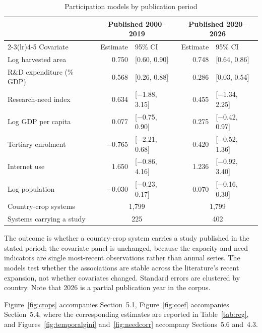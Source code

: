 \documentclass[ASNA,twocolumn]{USG}
\makeatletter
\newcommand{\applabel}[2]{\phantomsection\edef\@currentlabel{#1}\label{#2}}
\makeatother
\begin{document}
\begin{table}[!t]
\centering
\footnotesize
\caption{Participation models by publication period}
\label{tab:periods}
\begin{tabular*}{\textwidth}{@{\extracolsep\fill}l r@{\hspace{6pt}}l r@{\hspace{6pt}}l@{}}
\toprule
& \multicolumn{2}{c}{Published 2000--2019} & \multicolumn{2}{c}{Published 2020--2026} \\
\cmidrule(lr){2-3}\cmidrule(lr){4-5}
Covariate & Estimate & 95\% CI & Estimate & 95\% CI \\
\midrule
Log harvested area & 0.750 & [0.60, 0.90] & 0.748 & [0.64, 0.86] \\
R\&D expenditure (\% GDP) & 0.568 & [0.26, 0.88] & 0.286 & [0.03, 0.54] \\
Research-need index & 0.634 & [$-$1.88, 3.15] & 0.455 & [$-$1.34, 2.25] \\
Log GDP per capita & 0.077 & [$-$0.75, 0.90] & 0.275 & [$-$0.42, 0.97] \\
Tertiary enrolment & $-$0.765 & [$-$2.21, 0.68] & 0.420 & [$-$0.52, 1.36] \\
Internet use & 1.650 & [$-$0.86, 4.16] & 1.236 & [$-$0.92, 3.40] \\
Log population & $-$0.030 & [$-$0.23, 0.17] & 0.070 & [$-$0.16, 0.30] \\
\midrule
Country-crop systems & \multicolumn{2}{c}{1,799} & \multicolumn{2}{c}{1,799} \\
Systems carrying a study & \multicolumn{2}{c}{225} & \multicolumn{2}{c}{402} \\
\bottomrule
\end{tabular*}
\begin{tablenotes}
\item[] The outcome is whether a country-crop system carries a study published in the stated period; the covariate panel is unchanged, because the capacity and need indicators are single most-recent observations rather than annual series. The models test whether the associations are stable across the literature's recent expansion, not whether covariates changed. Standard errors are clustered by country. Note that 2026 is a partial publication year in the corpus.
\end{tablenotes}
\end{table}

\applabel{Appendix E}{app:figs}

Figure~\ref{fig:crops} accompanies Section~5.1, Figure~\ref{fig:coef} accompanies
Section~5.4, where the corresponding estimates are reported in Table~\ref{tab:reg}, and
Figures~\ref{fig:temporalgini} and~\ref{fig:needcorr} accompany Sections~5.6 and~4.3.
\end{document}
